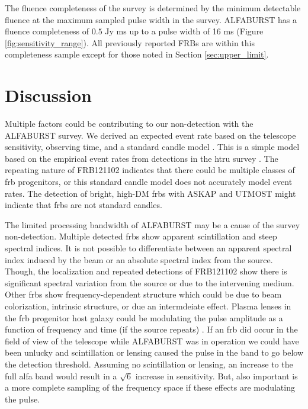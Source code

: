 \documentclass[a4paper,fleqn,usenatbib]{mnras}
\begin{document}



The fluence completeness of the survey \citep{2015MNRAS.447.2852K} is determined
by the minimum detectable fluence at the maximum sampled pulse width in the
survey. ALFABURST has a fluence completeness of $0.5$ Jy ms up to a pulse width
of 16 ms (Figure \ref{fig:sensitivity_range}). All previously reported FRBs are
within this completeness sample except for those noted in Section
\ref{sec:upper_limit}.


\section{Discussion}
\label{sec:discuss}

Multiple factors could be contributing to our non-detection with the ALFABURST
survey. We derived an expected event rate based on the telescope sensitivity,
observing time, and a standard candle model \citep{2013MNRAS.436L...5L}. This is
a simple model based on the empirical event rates from detections in the
\gls{htru} survey \citep{2013Sci...341...53T}.  The repeating nature of
FRB121102 indicates that there could be multiple classes of \gls{frb}
progenitors, or this standard candle model does not accurately model event
rates. The detection of bright, high-DM \glspl{frb} with ASKAP
\citep{2017ApJ...841L..12B} and UTMOST \citep{2017MNRAS.468.3746C,atel10697}
might indicate that \glspl{frb} are not standard candles.

The limited processing bandwidth of ALFABURST may be a cause of the survey
non-detection. Multiple detected \glspl{frb} show apparent scintillation and
steep spectral indices.  It is not possible to differentiate between an apparent
spectral index induced by the beam or an absolute spectral index from the
source.  Though, the localization and repeated detections of FRB121102 show
there is significant spectral variation from the source or due to the
intervening medium.  Other \glspl{frb} show frequency-dependent structure which
could be due to beam colorization, intrinsic structure, or due an intermdeiate
effect.  Plasma lenses in the \gls{frb} progenitor host galaxy could be
modulating the pulse amplitude as a function of frequency and time (if the
source repeats) \citep{2017ApJ...842...35C}.  If an \gls{frb} did occur in the
field of view of the telescope while ALFABURST was in operation we could have
been unlucky and scintillation or lensing caused the pulse in the band to go
below the detection threshold.  Assuming no scintillation or lensing, an
increase to the full \gls{alfa} band would result in a $\sqrt{6}$ increase in
sensitivity. But, also important is a more complete sampling of the frequency
space if these effects are modulating the pulse.
\end{document}
